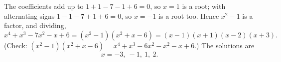 The coefficients add up to $1+1-7-1+6=0$, so $x=1$ is a root; with alternating signs $1-1-7+1+6=0$, so $x=-1$ is a root too. Hence $x^2-1$ is a factor, and dividing,
\[
x^4+x^3-7x^2-x+6=(x^2-1)(x^2+x-6)=(x-1)(x+1)(x-2)(x+3).
\]
(Check: $(x^2-1)(x^2+x-6)=x^4+x^3-6x^2-x^2-x+6$.) The solutions are
\[
x=\boxed{-3,\ -1,\ 1,\ 2}.
\]
